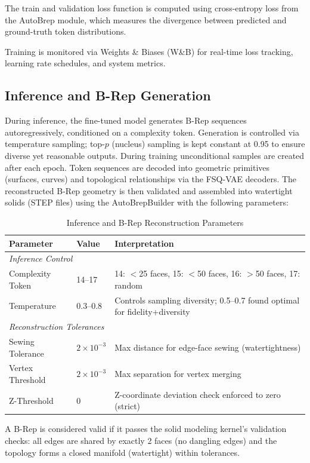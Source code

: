 \par

The train and validation loss function is computed using cross-entropy loss from the AutoBrep module, which measures the divergence between predicted and ground-truth token distributions.

Training is monitored via Weights \& Biases (W\&B) for real-time loss tracking, learning rate schedules, and system metrics.

\subsection{Inference and B-Rep Generation}

During inference, the fine-tuned model generates B-Rep sequences autoregressively, conditioned on a complexity token. Generation is controlled via temperature sampling; top-$p$ (nucleus) sampling is kept constant at 0.95 to ensure diverse yet reasonable outputs. During training unconditional samples are created after each epoch.
Token sequences are decoded into geometric primitives (surfaces, curves) and topological relationships via the FSQ-VAE decoders. The reconstructed B-Rep geometry is then validated and assembled into watertight solids (STEP files) using the AutoBrepBuilder with the following parameters:

\begin{table}[h!]
	\centering
	\caption{Inference and B-Rep Reconstruction Parameters}
	\label{tab:reconstruction_tolerances}
	\small
	\begin{tabularx}{\textwidth}{@{}l l l@{}}
		\toprule
		\textbf{Parameter} & \textbf{Value} & \textbf{Interpretation} \\
		\midrule
		\multicolumn{3}{l}{\textit{Inference Control}} \\
		\midrule
		Complexity Token & 14--17 & 14: $<$25 faces, 15: $<$50 faces, 16: $>$50 faces, 17: random \\
		Temperature & 0.3--0.8 & Controls sampling diversity; 0.5--0.7 found optimal for fidelity+diversity \\
		\midrule
		\multicolumn{3}{l}{\textit{Reconstruction Tolerances}} \\
		\midrule
		Sewing Tolerance & $2 \times 10^{-3}$ & Max distance for edge-face sewing (watertightness) \\
		Vertex Threshold & $2 \times 10^{-3}$ & Max separation for vertex merging \\
		Z-Threshold & 0 & Z-coordinate deviation check enforced to zero (strict) \\
		\bottomrule
	\end{tabularx}
\end{table}

A B-Rep is considered valid if it passes the solid modeling kernel's validation checks: all edges are shared by exactly 2 faces (no dangling edges) and the topology forms a closed manifold (watertight) within tolerances.
